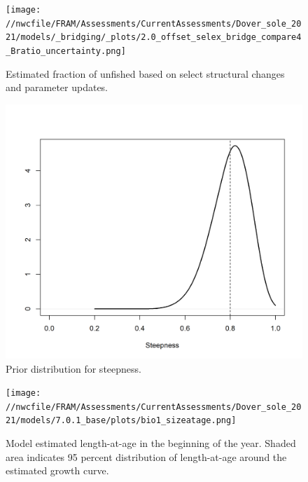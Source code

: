 \documentclass[11pt,
  english,
  a4paper,
]{article}
\begin{document}
\tagmcend\tagstructend


\begin{figure}
\centering
\texttt{[image: //nwcfile/FRAM/Assessments/CurrentAssessments/Dover\_sole\_2021/models/\_bridging/\_plots/2.0\_offset\_selex\_bridge\_compare4\_Bratio\_uncertainty.png]}
\caption{Estimated fraction of unfished based on select structural changes and parameter updates.\label{fig:structure-bridge-depl}}
\end{figure}

\tagmcend\tagstructend


\begin{figure}
\centering
\includegraphics[width=1\textwidth,height=1\textheight]{figs/h_prior.png}
\caption{Prior distribution for steepness.\label{fig:h-prior}}
\end{figure}

\tagmcend\tagstructend


\begin{figure}
\centering
\texttt{[image: //nwcfile/FRAM/Assessments/CurrentAssessments/Dover\_sole\_2021/models/7.0.1\_base/plots/bio1\_sizeatage.png]}
\caption{Model estimated length-at-age in the beginning of the year. Shaded area indicates 95 percent distribution of length-at-age around the estimated growth curve.\label{fig:mod-est-len-age}}
\end{figure}
\end{document}
